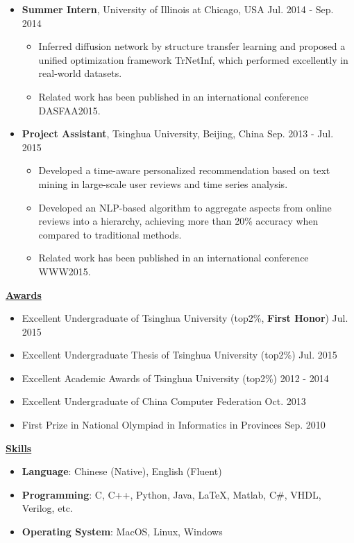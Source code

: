 \documentclass[11pt]{article}
\begin{document}
\begin{CJK}{GBK}{kai}
\begin{itemize}
   \item \textbf{Summer Intern}, University of Illinois at Chicago, USA \hfill Jul. 2014 - Sep. 2014\\
     \begin{itemize}
     \item Inferred diffusion network  by structure transfer learning and proposed a unified optimization framework TrNetInf, which performed excellently in real-world datasets.
     \item Related work has been published in an international conference DASFAA2015. \\\medskip
     \end{itemize}
  
   \item \textbf{Project Assistant}, Tsinghua University, Beijing, China \hfill Sep. 2013 - Jul. 2015\\
     \begin{itemize}
     \item Developed a time-aware personalized recommendation based on text mining in large-scale user reviews and time series analysis. 
     \item Developed an NLP-based algorithm to aggregate aspects from online reviews into a hierarchy, achieving more than 20\% accuracy when compared to traditional methods.
     \item Related work has been published in an international conference WWW2015.
     \end{itemize}
\end{itemize}


\bigskip

{ \textbf{\underline{Awards}}}\\
\begin{itemize}
\item Excellent Undergraduate of Tsinghua University (top2\%, \textbf{First Honor}) \hfill Jul. 2015
\item Excellent Undergraduate Thesis of Tsinghua University (top2\%) \hfill Jul. 2015
\item Excellent Academic Awards of Tsinghua University (top2\%) \hfill 2012 - 2014
\item Excellent Undergraduate of China Computer Federation \hfill Oct. 2013
\item First Prize in National Olympiad in Informatics in Provinces \hfill Sep. 2010
\end{itemize}

\bigskip

{ \textbf{\underline{Skills}}}
\begin{itemize}
    \item \textbf{Language}: Chinese (Native), English (Fluent)\\\smallskip
    \item \textbf{Programming}: C, C++, Python, Java, {\LaTeX},  Matlab, C\#, VHDL, Verilog, etc.\\\smallskip
    \item \textbf{Operating System}: MacOS, Linux, Windows
\end{itemize}

\end{CJK}
\end{document}
